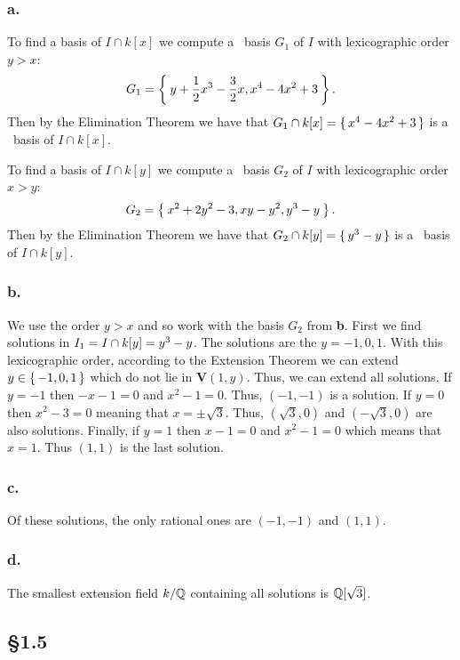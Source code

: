 \documentclass[letterpaper]{article}
\begin{document}
\subsubsection*{a.}

To find a basis of $I \cap k[x]$ we compute a \Grobner\ basis $G_{1}$ of $I$ with lexicographic order $y > x$:
\[
  G_{1} = \Set{y + \frac{1}{2}x^{3} - \frac{3}{2}x, x^{4} - 4 x^{2} + 3}.
\]
Then by the Elimination Theorem we have that $G_{1} \cap k[x] = \set{x^{4} - 4 x^{2} + 3}$ is a \Grobner\ basis of $I \cap k[x]$.

To find a basis of $I \cap k[y]$ we compute a \Grobner\ basis $G_{2}$ of $I$ with lexicographic order $x > y$:
\[
  G_{2} = \Set{x^{2} + 2 y^{2} - 3, xy - y^{2}, y^{3} - y}.
\]
Then by the Elimination Theorem we have that $G_{2} \cap k[y] = \set{y^{3} - y}$ is a \Grobner\ basis of $I \cap k[y]$.

\subsubsection*{b.}

We use the order $y > x$ and so work with the basis $G_{2}$ from \textbf{b}.
First we find solutions in $I_{1} = I \cap k[y] = \ideal{y^{3} - y}$.
The solutions are the $y = -1, 0, 1$.
With this lexicographic order, according to the Extension Theorem we can extend $y \in \set{-1, 0, 1}$ which do not lie in $\mathbf{V}(1, y)$.
Thus, we can extend all solutions.
If $y = -1$ then $-x - 1 = 0$ and $x^{2} - 1 = 0$.
Thus, $(-1, -1)$ is a solution.
If $y = 0$ then $x^{2} - 3 = 0$ meaning that $x = \pm \sqrt{3}$.
Thus, $(\sqrt{3}, 0)$ and $(-\sqrt{3}, 0)$ are also solutions.
Finally, if $y = 1$ then $x - 1 = 0$ and $x^{2} - 1 = 0$ which means that $x = 1$.
Thus $(1, 1)$ is the last solution.

\subsubsection*{c.}

Of these solutions, the only rational ones are $(-1, -1)$ and $(1, 1)$.

\subsubsection*{d.}

The smallest extension field $k / \mathbb{Q}$ containing all solutions is $\mathbb{Q}[\sqrt{3}]$.

\subsection*{\S 1.5}
\end{document}
